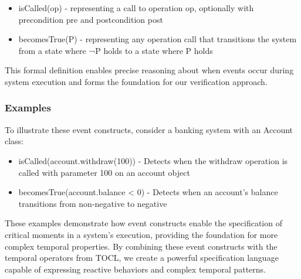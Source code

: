 \begin{itemize}
    \item isCalled(op) - representing a call to operation op, optionally with precondition pre and postcondition post
    \item becomesTrue(P) - representing any operation call that transitions the system from a state where ¬P holds to a state where P holds
\end{itemize}

This formal definition enables precise reasoning about when events occur during system execution and forms the foundation for our verification approach.

\subsubsection{Examples}

To illustrate these event constructs, consider a banking system with an Account class:

\begin{itemize}
    \item isCalled(account.withdraw(100)) - Detects when the withdraw operation is called with parameter 100 on an account object
    \item becomesTrue(account.balance < 0) - Detects when an account's balance transitions from non-negative to negative
\end{itemize}

These examples demonstrate how event constructs enable the specification of critical moments in a system's execution, providing the foundation for more complex temporal properties. By combining these event constructs with the temporal operators from TOCL, we create a powerful specification language capable of expressing reactive behaviors and complex temporal patterns.

